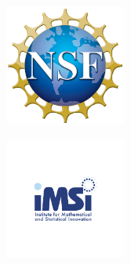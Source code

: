 \vspace{-10ex}
\begin{center}

	    \begin{minipage}{0.3\textwidth}
		\centering
		\includegraphics[height=4cm]{Photos/nsf_logo.png}
	\end{minipage}
	\hspace{2em}
	\begin{minipage}{0.3\textwidth}
		\centering
		\includegraphics[height=4cm]{Photos/imsi_logo.png}
	\end{minipage} \\[1em]
	

\end{center}
